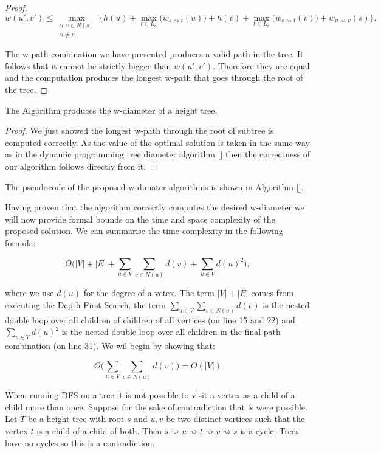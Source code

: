 \begin{proof}
   $$ w(u', v') \le \max\limits_{\substack{u, v \in N(s) \\ u \ne v}}\{ h(u) + \max\limits_{t \in L_u}\Big(w_{s \rightsquigarrow t}(u)\Big) + h(v) + \max\limits_{t \in L_v}\Big(w_{s \rightsquigarrow t}(v)\Big) + w_{u \rightsquigarrow v}(s)\}. $$

   The w-path combination we have presented produces a valid path in the tree. It follows that it cannot be strictly bigger than $w(u', v')$. Therefore they are equal and the computation produces the longest w-path that goes through the root of the tree.

\end{proof}


\begin{lem} The Algorithm produces the w-diameter of a height tree. \end{lem}

\begin{proof}

   We just showed the longest w-path through the root of subtree is computed correctly. As the value of the optimal solution is taken in the same way as in the dynamic programming tree diameter algorithm [] then the correctness of our algorithm follows directly from it.

\end{proof}

The pseudocode of the proposed w-dimater algorithms is shown in Algorithm [].


Having proven that the algorithm correctly computes the desired w-diameter we will now provide formal bounds on the time and space complexity of the proposed solution. We can summarise the time complexity in the following formula:

$$ O\bigg( |V| + |E| + \sum_{u \in V}{\sum_{v \in N(u)}{d(v)}} + \sum_{u \in V}{d(u)^2}  \bigg) ,$$

where we use $d(u)$ for the degree of a vetex. The term $|V| + |E|$ comes from executing the Depth First Search, the term $\sum_{u \in V}{\sum_{v \in N(u)}{d(v)}}$ is the nested double loop over all children of children of all vertices (on line 15 and 22) and $\sum_{u \in V}{d(u)^2}$ is the nested double loop over all children in the final path combination (on line 31). We wil begin by showing that:

$$ O\bigg( \sum_{u \in V}{\sum_{v \in N(u)}{d(v)}} \bigg) = O(|V|) $$

When running DFS on a tree it is not possible to visit a vertex as a child of a child more than once. Suppose for the sake of contradiction that is were possible. Let $T$ be a height tree with root $s$ and $u, v$ be two distinct vertices such that the vertex $t$ is a child of a child of both. Then $s \rightsquigarrow u \rightsquigarrow t \rightsquigarrow v \rightsquigarrow s$ is a cycle. Trees have no cycles so this is a contradiction.

